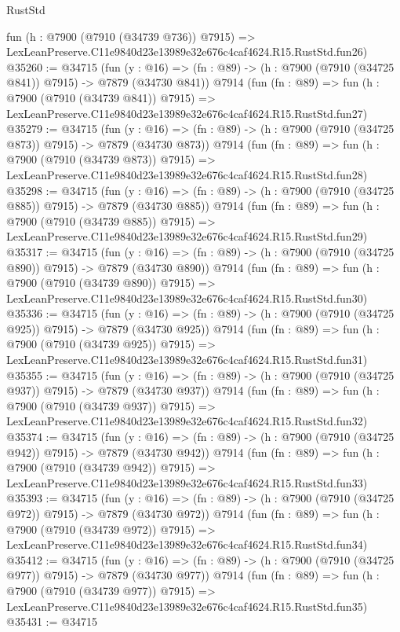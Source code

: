 \begin{lexlean}{RustStd}
\begin{coremodule}
    fun (h : @7900 (@7910 (@34739 @736)) @7915) =>
    LexLeanPreserve.C11e9840d23e13989e32e676c4caf4624.R15.RustStd.fun26)
@35260 := @34715
    (fun (y : @16) => (fn : @89) -> (h : @7900 (@7910 (@34725 @841)) @7915) -> @7879 (@34730 @841))
    @7914
    (fun (fn : @89) =>
    fun (h : @7900 (@7910 (@34739 @841)) @7915) =>
    LexLeanPreserve.C11e9840d23e13989e32e676c4caf4624.R15.RustStd.fun27)
@35279 := @34715
    (fun (y : @16) => (fn : @89) -> (h : @7900 (@7910 (@34725 @873)) @7915) -> @7879 (@34730 @873))
    @7914
    (fun (fn : @89) =>
    fun (h : @7900 (@7910 (@34739 @873)) @7915) =>
    LexLeanPreserve.C11e9840d23e13989e32e676c4caf4624.R15.RustStd.fun28)
@35298 := @34715
    (fun (y : @16) => (fn : @89) -> (h : @7900 (@7910 (@34725 @885)) @7915) -> @7879 (@34730 @885))
    @7914
    (fun (fn : @89) =>
    fun (h : @7900 (@7910 (@34739 @885)) @7915) =>
    LexLeanPreserve.C11e9840d23e13989e32e676c4caf4624.R15.RustStd.fun29)
@35317 := @34715
    (fun (y : @16) => (fn : @89) -> (h : @7900 (@7910 (@34725 @890)) @7915) -> @7879 (@34730 @890))
    @7914
    (fun (fn : @89) =>
    fun (h : @7900 (@7910 (@34739 @890)) @7915) =>
    LexLeanPreserve.C11e9840d23e13989e32e676c4caf4624.R15.RustStd.fun30)
@35336 := @34715
    (fun (y : @16) => (fn : @89) -> (h : @7900 (@7910 (@34725 @925)) @7915) -> @7879 (@34730 @925))
    @7914
    (fun (fn : @89) =>
    fun (h : @7900 (@7910 (@34739 @925)) @7915) =>
    LexLeanPreserve.C11e9840d23e13989e32e676c4caf4624.R15.RustStd.fun31)
@35355 := @34715
    (fun (y : @16) => (fn : @89) -> (h : @7900 (@7910 (@34725 @937)) @7915) -> @7879 (@34730 @937))
    @7914
    (fun (fn : @89) =>
    fun (h : @7900 (@7910 (@34739 @937)) @7915) =>
    LexLeanPreserve.C11e9840d23e13989e32e676c4caf4624.R15.RustStd.fun32)
@35374 := @34715
    (fun (y : @16) => (fn : @89) -> (h : @7900 (@7910 (@34725 @942)) @7915) -> @7879 (@34730 @942))
    @7914
    (fun (fn : @89) =>
    fun (h : @7900 (@7910 (@34739 @942)) @7915) =>
    LexLeanPreserve.C11e9840d23e13989e32e676c4caf4624.R15.RustStd.fun33)
@35393 := @34715
    (fun (y : @16) => (fn : @89) -> (h : @7900 (@7910 (@34725 @972)) @7915) -> @7879 (@34730 @972))
    @7914
    (fun (fn : @89) =>
    fun (h : @7900 (@7910 (@34739 @972)) @7915) =>
    LexLeanPreserve.C11e9840d23e13989e32e676c4caf4624.R15.RustStd.fun34)
@35412 := @34715
    (fun (y : @16) => (fn : @89) -> (h : @7900 (@7910 (@34725 @977)) @7915) -> @7879 (@34730 @977))
    @7914
    (fun (fn : @89) =>
    fun (h : @7900 (@7910 (@34739 @977)) @7915) =>
    LexLeanPreserve.C11e9840d23e13989e32e676c4caf4624.R15.RustStd.fun35)
@35431 := @34715

\end{coremodule}
\end{lexlean}
